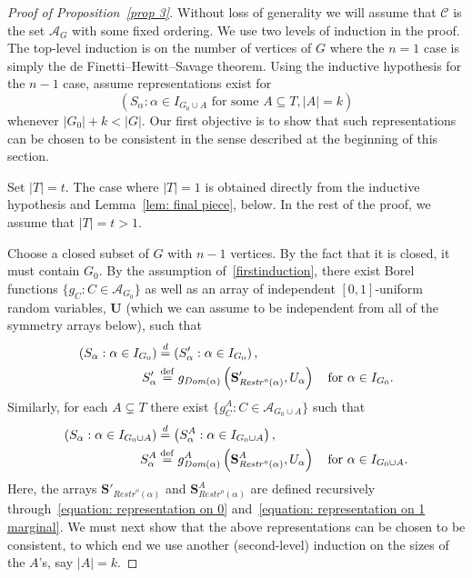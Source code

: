 \documentclass[10pt]{amsart}
\theoremstyle{definition}\newtheorem{defi}[theo]{Definition}\newtheorem{rema}[theo]{Remark}\newtheorem{exam}[theo]{Example}\newtheorem{exem}[theo]{Example}\newtheorem{nota}[theo]{Notation}
\newcommand{\alf}{\alpha}%
\newcommand*{\defeq}{\stackrel{\mathrm{def}}{=}}
\renewcommand{\d}{\buildrel{d}\over{=}}
\newcommand*\srstr{\mathit{Restr}^o}
\newcommand*\dom{\mathit{Dom}}
\renewcommand{\AA}{\mathcal{A}}
\newcommand*\CC{{\mathcal{C}}}
\newcommand*\bS{\mathbf{S}}
\newcommand*\bU{\mathbf{U}}
\begin{document}
\begin{proof}[Proof of Proposition~\ref{prop 3}]
Without loss of generality we will assume that $\CC$ is the set $\AA_G$ with some fixed ordering. We use two levels of induction in the proof. The top-level induction is on the number of vertices of $G$ where the $n=1$ case is simply the de Finetti--Hewitt--Savage theorem. Using the inductive hypothesis for the $n-1$ case, assume representations exist for
\begin{equation}\label{firstinduction}
(S_\alpha : \alpha \in I_{G_0 \cup A} \text{ for some } A \subseteq T, |A|=k)
\end{equation}
whenever $|G_0|+k<|G|$. Our first objective is to show that such representations can be chosen to be consistent in the sense described at the beginning of this section.

Set $|T|=t$. The case where $|T|=1$ is obtained directly from the inductive hypothesis and Lemma~\ref{lem: final piece}, below. In the rest of the proof, we assume that $|T| = t >1$.

Choose a closed subset of $G$ with $n-1$ vertices. By the fact that it is closed, it must contain $G_0$. By the assumption of~\eqref{firstinduction}, there exist Borel functions $\{g_C: C \in \AA_{G_0}\}$ as well as an array of independent $[0,1]$-uniform random variables, $\bU$ (which we can assume to be independent from all of the symmetry arrays below), such that
\begin{equation}\label{equation: representation on 0}
\begin{aligned}
(S_\alf : \alf \in I_{G_0}) & \d \left(S'_\alf : \alf \in I_{G_0}\right),
\\
S'_\alf &
\defeq g_{\dom(\alf)}\left(\bS'_{\srstr(\alf)}, U_\alf\right)\quad \text{for } \alf \in I_{G_0}.
\end{aligned}
\end{equation}
Similarly, for each $A\subsetneq T$ there exist $\{g^A_C: C \in \AA_{G_0 \cup A}\}$ such that
\begin{equation}\label{equation: representation on 1 marginal}
\begin{aligned}
(S_\alf : \alf \in I_{G_0 \cup A}) & \d \left(S^A_\alf : \alf \in I_{G_0 \cup A}\right),
\\
S^A_\alf &
\defeq g^A_{\dom(\alf)}\left(\bS^A_{\srstr(\alf)}, U_\alf\right) \quad\text{for } \alf \in I_{G_0 \cup A}.
\end{aligned}
\end{equation}
Here, the arrays $\bS'_{\srstr(\alf)}$ and $\bS^A_{\srstr(\alf)}$ are defined recursively through~\eqref{equation: representation on 0} and~\eqref{equation: representation on 1 marginal}. We must next show that the above representations can be chosen to be consistent, to which end we use another (second-level) induction on the sizes of the $A$'s, say $|A|=k$.


\end{proof}
\end{document}

